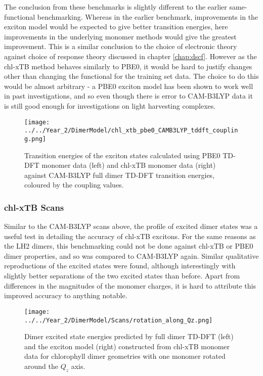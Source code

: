 The conclusion from these benchmarks is slightly different to the earlier same-functional
benchmarking. Whereas in the earlier benchmark, improvements in the exciton model
would be expected to give better transition energies, here improvements in the underlying
monomer methods would give the greatest improvement. This is a similar conclusion
to the choice of electronic theory against choice of response theory discussed in
chapter \ref{chap:dscf}. However as the chl-xTB method behaves similarly to PBE0,
it would be hard to justify changes other than changing the functional for the training 
set data. The choice to do this would be almost arbitrary - a PBE0 exciton model has
been shown to work well in past investigations, and so even though there is error
to CAM-B3LYP data it is still good enough for investigations on light harvesting 
complexes.

\begin{figure}
    \centering
    \texttt{[image: ../../Year\_2/DimerModel/chl\_xtb\_pbe0\_CAMB3LYP\_tddft\_coupling.png]}
    \caption{Transition energies of the exciton states calculated using PBE0 TD-DFT
    monomer data (left) and chl-xTB monomer data (right) against CAM-B3LYP full
    dimer TD-DFT transition energies, coloured by the coupling values.}
    \label{fig:chl_xtb_pbe0_LH2}
\end{figure}

\subsubsection{chl-xTB Scans}
\label{subsubsec:chl_xtb_scans}

Similar to the CAM-B3LYP scans above, the profile of excited dimer states was a useful
test in detailing the accuracy of chl-xTB excitons. For the same reasons as the
LH2 dimers, this benchmarking could not be done against chl-xTB or PBE0 dimer properties,
and so was compared to CAM-B3LYP again. Similar qualitative reproductions of the
excited states were found, although interestingly with slightly better separations
of the two excited states than before. Apart from differences in the magnitudes 
of the monomer charges, it is hard to attribute this improved accuracy to anything
notable.

\begin{figure}
    \centering
    \texttt{[image: ../../Year\_2/DimerModel/Scans/rotation\_along\_Qz.png]}
    \caption{Dimer excited state energies predicted by full dimer TD-DFT (left)
    and the exciton model (right) constructed from chl-xTB monomer data for chlorophyll 
    dimer geometries with one monomer rotated around the $Q_z$ axis.}
    \label{fig:chl_xtb_rot_Qz}
\end{figure}

